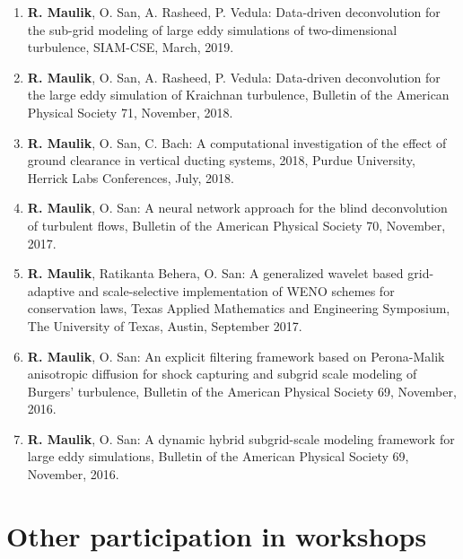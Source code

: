 \documentclass[letterpaper]{article}
\begin{document}
\begin{enumerate}
\item \textbf{R. Maulik}, O. San, A. Rasheed, P. Vedula: Data-driven deconvolution for the sub-grid modeling of large eddy simulations of two-dimensional turbulence, SIAM-CSE, March, 2019.

\item \textbf{R. Maulik}, O. San, A. Rasheed, P. Vedula: Data-driven deconvolution for the large eddy simulation of Kraichnan turbulence, Bulletin of the American Physical Society 71, November, 2018.

\item \textbf{R. Maulik}, O. San, C. Bach: A computational investigation of the effect of ground clearance in vertical ducting systems, 2018, Purdue University, Herrick Labs Conferences, July, 2018. 

\item \textbf{R. Maulik}, O. San: A neural network approach for the blind deconvolution of turbulent flows, Bulletin of the American Physical Society 70, November, 2017.

\item \textbf{R. Maulik}, Ratikanta Behera, O. San: A generalized wavelet based grid-adaptive and scale-selective
implementation of WENO schemes for conservation laws, Texas Applied Mathematics and Engineering Symposium, The University of Texas, Austin, September 2017.

\item \textbf{R. Maulik}, O. San: An explicit filtering framework based on Perona-Malik anisotropic diffusion for shock capturing and subgrid scale modeling of Burgers' turbulence, Bulletin of the American Physical Society 69, November, 2016.

\item \textbf{R. Maulik}, O. San:  A dynamic hybrid subgrid-scale modeling framework for large eddy simulations, Bulletin of the American Physical Society 69, November, 2016.

\end{enumerate}

\section*{Other participation in workshops}
\end{document}

